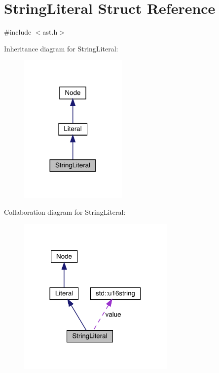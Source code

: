 \hypertarget{struct_string_literal}{}\section{String\+Literal Struct Reference}
\label{struct_string_literal}


{\ttfamily \#include $<$ast.\+h$>$}



Inheritance diagram for String\+Literal\+:
\nopagebreak
\begin{figure}[H]
\begin{center}
\leavevmode
\includegraphics[width=149pt]{struct_string_literal__inherit__graph}
\end{center}
\end{figure}


Collaboration diagram for String\+Literal\+:
\nopagebreak
\begin{figure}[H]
\begin{center}
\leavevmode
\includegraphics[width=218pt]{struct_string_literal__coll__graph}
\end{center}
\end{figure}
